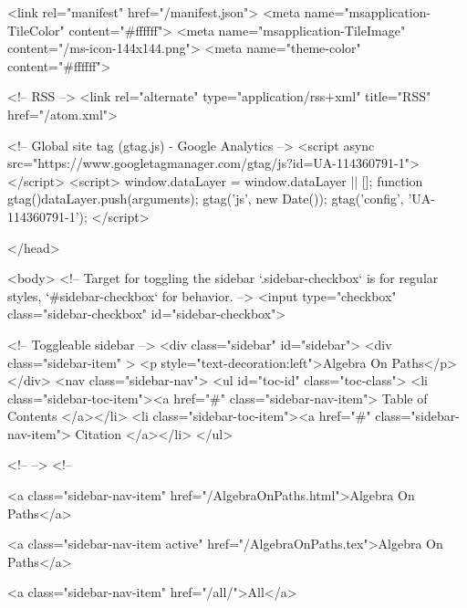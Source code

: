   <link rel="manifest" href="/manifest.json">
  <meta name="msapplication-TileColor" content="#ffffff">
  <meta name="msapplication-TileImage" content="/ms-icon-144x144.png">
  <meta name="theme-color" content="#ffffff">
  
  <!-- RSS -->
  <link rel="alternate" type="application/rss+xml" title="RSS" href="/atom.xml">

  <!-- Global site tag (gtag.js) - Google Analytics -->
  <script async src="https://www.googletagmanager.com/gtag/js?id=UA-114360791-1"></script>
  <script>
    window.dataLayer = window.dataLayer || [];
    function gtag(){dataLayer.push(arguments);}
    gtag('js', new Date());
    gtag('config', 'UA-114360791-1');
  </script>

  
</head>




  <body>
    <!-- Target for toggling the sidebar `.sidebar-checkbox` is for regular
     styles, `#sidebar-checkbox` for behavior. -->
<input type="checkbox" class="sidebar-checkbox" id="sidebar-checkbox">

<!-- Toggleable sidebar -->
<div class="sidebar" id="sidebar">
  <div class="sidebar-item" >
    <p style="text-decoration:left">Algebra On Paths</p>
  </div>
  <nav class="sidebar-nav">
    <ul id="toc-id" class="toc-class">
  <li class="sidebar-toc-item"><a href="#" class="sidebar-nav-item"> Table of Contents </a></li>
  <li class="sidebar-toc-item"><a href="#" class="sidebar-nav-item"> Citation </a></li>
</ul>


    <!--  -->
    <!-- 
      
    
      
    
      
    
      
        
      
    
      
        
          <a class="sidebar-nav-item" href="/AlgebraOnPaths.html">Algebra On Paths</a>
        
      
    
      
        
          <a class="sidebar-nav-item active" href="/AlgebraOnPaths.tex">Algebra On Paths</a>
        
      
    
      
        
          <a class="sidebar-nav-item" href="/all/">All</a>
        
      
    
      
        

